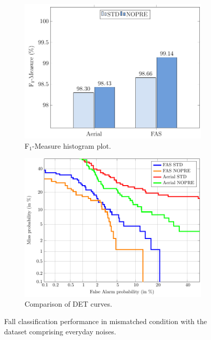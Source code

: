 \begin{figure}[t]
	\centering
	\begin{subfigure}[b]{0.8\textwidth}
		\includegraphics[width=\textwidth]{img/winr2016/pgfsource/8_bck_mismatched/BAR_8_bck_mismatched.pdf}
		\caption{F$_1$-Measure histogram plot.}\label{fig:mism_bck_BAR}	
	\end{subfigure}
	\hspace{5mm}
	\begin{subfigure}[b]{0.8\textwidth}
		\includegraphics[width=\textwidth]{img/winr2016/matlab2tikz/8_bck_mismatched/DET_8_bck_mismatched.pdf}
		\caption{Comparison of DET curves.}\label{fig:mism_bck_DET}	
	\end{subfigure}
	\caption{Fall classification performance in mismatched condition with the dataset comprising everyday noises.}

\end{figure}

